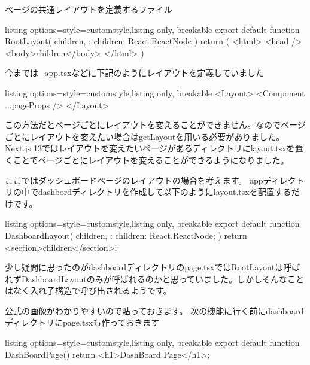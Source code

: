ページの共通レイアウトを定義するファイル




\begin{tcblisting}{listing options={style=customstyle},listing only, breakable}
  export default function RootLayout({
      children,
    }: {
  children: React.ReactNode
  }) {
      return (
      <html>
        <head />
        <body>{children}</body>
      </html>
      )
    }

\end{tcblisting}


今までは\_app.tsxなどに下記のようにレイアウトを定義していました
\begin{tcblisting}{listing options={style=customstyle},listing only, breakable}
  <Layout>
  <Component {...pageProps} />
  </Layout>
\end{tcblisting}




この方法だとページごとにレイアウトを変えることができません。なのでページごとにレイアウトを変えたい場合はgetLayoutを用いる必要がありました。Next.js 13ではレイアウトを変えたいページがあるディレクトリにlayout.tsxを置くことでページごとにレイアウトを変えることができるようになりました。


ここではダッシュボードページのレイアウトの場合を考えます。
appディレクトリの中でdashbordディレクトリを作成して以下のようにlayout.tsxを配置するだけです。


\begin{tcblisting}{listing options={style=customstyle},listing only, breakable}
  export default function DashboardLayout({
      children,
    }: {
  children: React.ReactNode;
  }) {
      return <section>{children}</section>;
    }
\end{tcblisting}




少し疑問に思ったのがdashboardディレクトリのpage.tsxではRootLayoutは呼ばれずDashboardLayoutのみが呼ばれるのかと思っていました。しかしそんなことはなく入れ子構造で呼び出されるようです。

公式の画像がわかりやすいので貼っておきます。
次の機能に行く前にdashboardディレクトリにpage.tsxも作っておきます

\begin{tcblisting}{listing options={style=customstyle},listing only, breakable}
  export default function DashBoardPage() {
      return <h1>DashBoard Page</h1>;
    }

\end{tcblisting}


